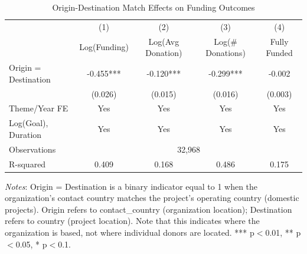 \begin{table}[htbp]
\centering
\caption{Origin-Destination Match Effects on Funding Outcomes}
\label{tab:origin_destination}
\begin{threeparttable}
\begin{tabular}{lcccc}
\toprule
& (1) & (2) & (3) & (4) \\
& Log(Funding) & Log(Avg Donation) & Log(\# Donations) & Fully Funded \\
\midrule
Origin = Destination & -0.455*** & -0.120*** & -0.299*** & -0.002 \\
& (0.026) & (0.015) & (0.016) & (0.003) \\
\midrule
Theme/Year FE & Yes & Yes & Yes & Yes \\
Log(Goal), Duration & Yes & Yes & Yes & Yes \\
\midrule
Observations & \multicolumn{4}{c}{32,968} \\
R-squared & 0.409 & 0.168 & 0.486 & 0.175 \\
\bottomrule
\end{tabular}
\begin{tablenotes}
\small
\item \textit{Notes}: Origin = Destination is a binary indicator equal to 1 when the organization's contact country matches the project's operating country (domestic projects). Origin refers to contact\_country (organization location); Destination refers to country (project location). Note that this indicates where the organization is based, not where individual donors are located. *** p$<$0.01, ** p$<$0.05, * p$<$0.1.
\end{tablenotes}
\end{threeparttable}
\end{table}

